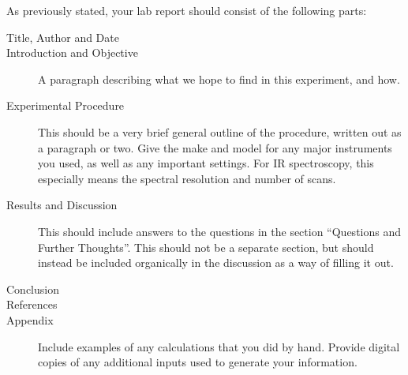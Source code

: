 As previously stated, your lab report should consist of the following parts:
\begin{description}
	\item[Title, Author and Date]
	\item[Introduction and Objective] A paragraph describing what we hope to find in this experiment, and how.
	\item[Experimental Procedure] This should be a very brief general outline of the procedure, written out as a paragraph or two. Give the make and model for any major instruments you used, as well as any important settings. For IR spectroscopy, this especially means the spectral resolution and number of scans.
	\item[Results and Discussion] This should include answers to the questions in the section ``Questions and Further Thoughts''. This should not be a separate section, but should instead be included organically in the discussion as a way of filling it out.
	\item[Conclusion]
	\item[References]
	\item[Appendix] Include examples of any calculations that you did by hand. 
	Provide digital copies of any additional inputs used to generate your information. 
\end{description}
